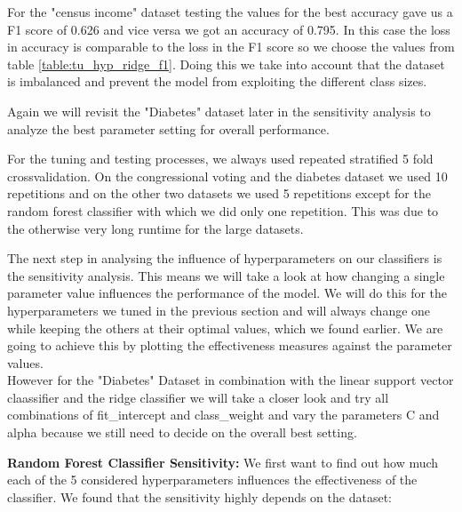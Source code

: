 \documentclass[a4paper,10pt]{article}
\begin{document}
For the "census income" dataset testing the values for the best accuracy gave us a F1 score of 0.626 and vice versa we got an accuracy of 0.795. In this case the loss in accuracy is comparable to the loss in the F1 score so we choose the values from table \ref{table:tu_hyp_ridge_f1}. Doing this we take into account that the dataset is imbalanced and prevent the model from exploiting the different class sizes.

Again we will revisit the "Diabetes" dataset later in the sensitivity analysis to analyze the best parameter setting for overall performance.


For the tuning and testing processes, we always used repeated stratified 5 fold crossvalidation. On the congressional voting and the diabetes dataset we used 10 repetitions and on the other two datasets we used 5 repetitions except for the random forest classifier with which we did only one repetition. This was due to the otherwise very long runtime for the large datasets.

The next step in analysing the influence of hyperparameters on our classifiers is the sensitivity analysis. This means we will take a look at how changing a single parameter value influences the performance of the model. We will do this for the hyperparameters we tuned in the previous section and will always change one while keeping the others at their optimal values, which we found earlier. We are going to achieve this by plotting the effectiveness measures against the parameter values.\\
However for the "Diabetes" Dataset in combination with the linear support vector claassifier and the ridge classifier we will take a closer look and try all combinations of \textsf{fit\_intercept} and \textsf{class\_weight} and vary the parameters \textsf{C} and \textsf{alpha} because we still need to decide on the overall best setting.

\textbf{Random Forest Classifier Sensitivity:}
We first want to find out how much each of the 5 considered hyperparameters influences the effectiveness of the classifier. We found that the sensitivity highly depends on the dataset:
\end{document}
